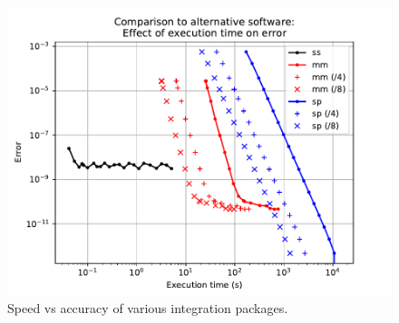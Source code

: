 \documentclass{jors}
\begin{document}
			\begin{figure}[h!]
				\includegraphics[scale=0.9]{benchmark_external_execution_error.pdf}
				\caption{Speed vs accuracy of various integration packages.}
				\label{fig:benchmark_external}
			\end{figure}

\end{document}
